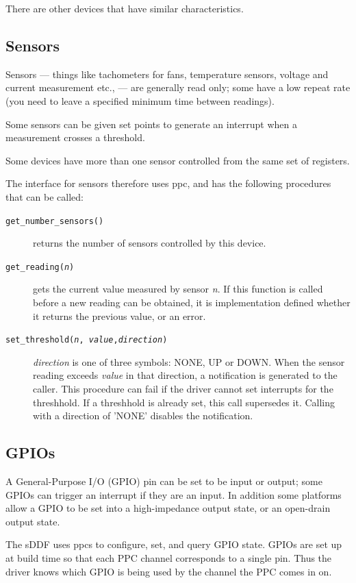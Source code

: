 \documentclass[a4paper,12pt]{report}
\begin{document}
There are other devices that have similar characteristics.

\subsection{Sensors}
Sensors --- things like tachometers for fans, temperature sensors,
voltage and current measurement etc., --- are generally read only;
some have a low repeat rate (you need to leave a specified minimum
time between readings).

Some sensors can be given set points to generate an interrupt when a
measurement crosses a threshold.

Some devices have more than one sensor controlled from the same set of
registers.

The interface for sensors therefore uses \gls{ppc}, and has the following
procedures that can be called:
\begin{description}
  \item[\texttt{get\_number\_sensors()}] returns the number of sensors
    controlled by this device.
  \item[\texttt{get\_reading(\emph{n})}] gets the current value
    measured by sensor \emph{n}.  If this function is called before a new
      reading can be obtained, it is implementation defined whether
      it returns the previous value, or an error.
  \item[\texttt{set\_threshold(\emph{n}, \emph{value},\emph{direction})}]
    \emph{direction} is one of three symbols: NONE, UP or DOWN.  When the
    sensor reading exceeds \emph{value} in that direction, a
    notification is generated to the caller.
    This procedure can fail if the driver cannot set interrupts for
    the threshhold.  If a threshhold is already set, this call
    supersedes it.  Calling with a direction of 'NONE' disables the
    notification.
\end{description}

\subsection{GPIOs}\label{s:gpio}
A General-Purpose I/O (GPIO) pin can be set to be input or
output; some GPIOs can trigger an interrupt if they are an input. In
addition some platforms allow a GPIO to be set into a high-impedance
output state, or an open-drain output state.

The sDDF uses \gls{ppc}s to configure, set, and query GPIO state.  GPIOs are
set up at build time so that each PPC channel corresponds to a
single pin.  Thus the driver knows which GPIO is being used by the
channel the PPC comes in on.
\end{document}
